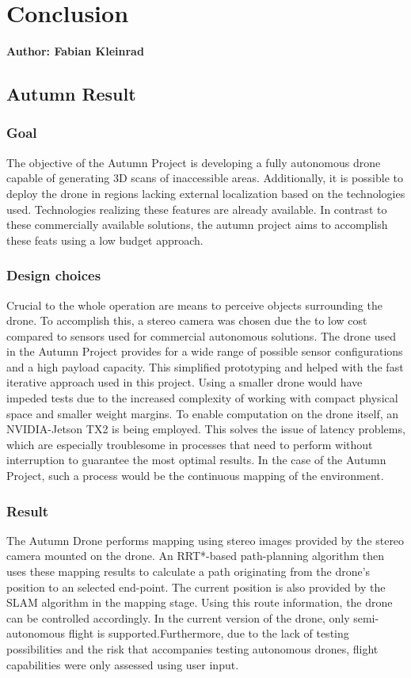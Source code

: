\chapter{Conclusion}

\textbf{Author: Fabian Kleinrad} 

\section{Autumn Result}

\subsection{Goal}
The objective of the Autumn Project is developing a fully autonomous drone capable of generating 3D scans of inaccessible areas. Additionally, it is possible to deploy the drone in regions lacking external localization based on the technologies used. Technologies realizing these features are already available. In contrast to these commercially available solutions, the autumn project aims to accomplish these feats using a low budget approach. 

\subsection{Design choices}
Crucial to the whole operation are means to perceive objects surrounding the drone. To accomplish this, a stereo camera was chosen due the to low cost compared to sensors used for commercial autonomous solutions.\newline
The drone used in the Autumn Project provides for a wide range of possible sensor configurations and a high payload capacity. This simplified prototyping and helped with the fast iterative approach used in this project. Using a smaller drone would have impeded tests due to the increased complexity of working with compact physical space and smaller weight margins.\newline
To enable computation on the drone itself, an NVIDIA-Jetson TX2 is being employed. This solves the issue of latency problems, which are especially troublesome in processes that need to perform without interruption to guarantee the most optimal results. In the case of the Autumn Project, such a process would be the continuous mapping of the environment.
\pagebreak
\subsection{Result}
The Autumn Drone performs mapping using stereo images provided by the stereo camera mounted on the drone. An RRT*-based path-planning algorithm then uses these mapping results to calculate a path originating from the drone's position to an selected end-point. The current position is also provided by the SLAM algorithm in the mapping stage. Using this route information, the drone can be controlled accordingly.
In the current version of the drone, only semi-autonomous flight is supported.Furthermore, due to the lack of testing possibilities and the risk that accompanies testing autonomous drones, flight capabilities were only assessed using user input.

